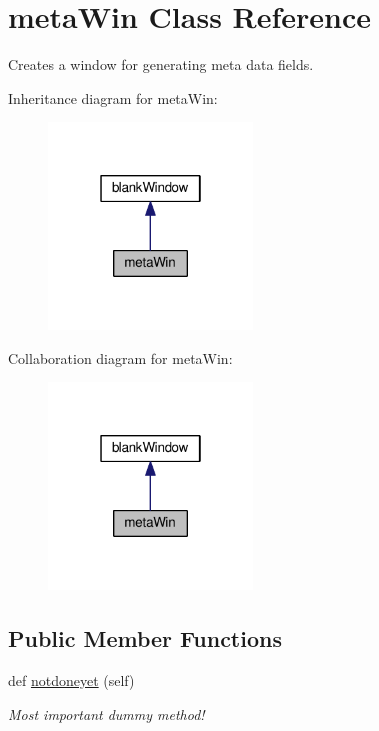 \hypertarget{classgui_1_1window_1_1metaWin}{}\section{meta\+Win Class Reference}
\label{classgui_1_1window_1_1metaWin}


Creates a window for generating meta data fields.  




Inheritance diagram for meta\+Win\+:
\nopagebreak
\begin{figure}[H]
\begin{center}
\leavevmode
\includegraphics[width=154pt]{classgui_1_1window_1_1metaWin__inherit__graph}
\end{center}
\end{figure}


Collaboration diagram for meta\+Win\+:
\nopagebreak
\begin{figure}[H]
\begin{center}
\leavevmode
\includegraphics[width=154pt]{classgui_1_1window_1_1metaWin__coll__graph}
\end{center}
\end{figure}
\subsection*{Public Member Functions}
\begin{DoxyCompactItemize}
\item 
def \hyperlink{classgui_1_1window_1_1metaWin_a2d865a6aea10146f28c546bed4ae1f44}{notdoneyet} (self)\hypertarget{classgui_1_1window_1_1metaWin_a2d865a6aea10146f28c546bed4ae1f44}{}\label{classgui_1_1window_1_1metaWin_a2d865a6aea10146f28c546bed4ae1f44}

\begin{DoxyCompactList}\small\item\em Most important dummy method! \end{DoxyCompactList}\end{DoxyCompactItemize}


